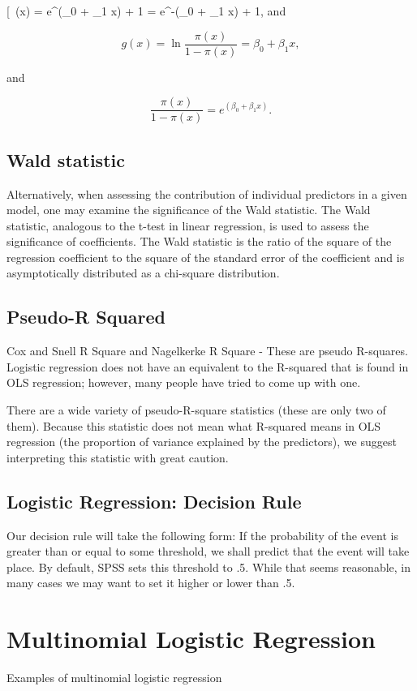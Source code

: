 \documentclass[12pt]{article}
\begin{document}
[\ \pi(x) =  {e^{(\beta_0 + \beta_1 x)} + 1} =  {e^{-(\beta_0 + \beta_1 x)} + 1},\]
and

\[g(x) = \ln \frac {\pi(x)} {1 - \pi(x)} = \beta_0 + \beta_1 x ,\]

and

\[\frac{\pi(x)} {1 - \pi(x)} = e^{(\beta_0 + \beta_1 x)}.\]

\subsection{Wald statistic}

Alternatively, when assessing the contribution of individual predictors in a given model, one may examine the significance of the Wald statistic. The Wald statistic, analogous to the t-test in linear regression, is used to assess the significance of coefficients. The Wald statistic is the ratio of the square of the regression coefficient to the square of the standard error of the coefficient and is asymptotically distributed as a chi-square distribution.

\subsection{Pseudo-R Squared}
Cox  and Snell R Square and Nagelkerke R Square - These are pseudo R-squares.  Logistic regression does not have an equivalent to the R-squared that is found in OLS regression; however, many people have tried to come up with one.  

There are a wide variety of pseudo-R-square statistics (these are only two of them).  Because this statistic does not mean what R-squared means in OLS regression (the proportion of variance explained by the predictors), we suggest interpreting this statistic with great caution.
\newpage
\subsection{Logistic Regression: Decision Rule}
Our decision rule will take the following form: If the probability of the event is greater than or equal to some threshold, we shall predict that the event will take place. By default, SPSS sets this threshold to .5. While that seems reasonable, in many cases we may want to set it higher or lower than .5.

\section{Multinomial Logistic Regression}
Examples of multinomial logistic regression
\end{document}
